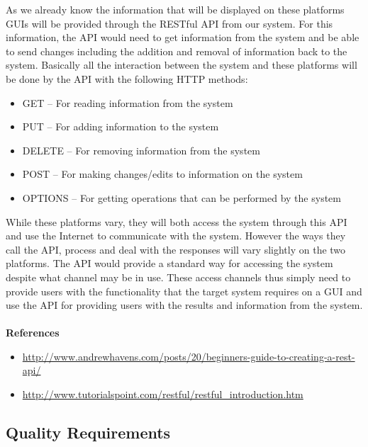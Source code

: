\documentclass[a4paper,12pt]{article}
\begin{document}
As we already know the information that will be displayed on these platforms GUIs will be provided through the RESTful API from our system. For this information, the API would need to get information from the system and be able to send changes including the addition and removal of information back to the system. Basically all the interaction between the system and these platforms will be done by the API with the following HTTP methods:
\begin{itemize}
	\item GET – For reading information from the system
	\item PUT – For adding information to the system
	\item DELETE – For removing information from the system
	\item POST – For making changes/edits to information on the system
	\item OPTIONS – For getting operations that can be performed by the system
\end{itemize}

While these platforms vary, they will both access the system through this API and use the Internet to communicate with the system. However the ways they call the API, process and deal with the responses will vary slightly on the two platforms. The API would provide a standard way for accessing the system despite what channel may be in use. These access channels thus simply need to provide users with the functionality that the target system requires on a GUI and use the API for providing users with the results and information from the system.
\\\\
\textbf{References}
\begin{itemize}
\item \url{http://www.andrewhavens.com/posts/20/beginners-guide-to-creating-a-rest-api/}
\item \url{http://www.tutorialspoint.com/restful/restful_introduction.htm}
\end{itemize}

\subsection{Quality Requirements}
\end{document}
